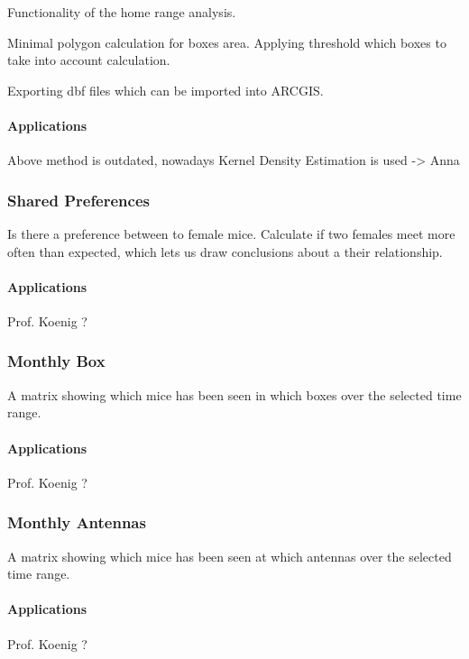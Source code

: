 Functionality of the home range analysis.

Minimal polygon calculation for boxes area.
Applying threshold which boxes to take into account calculation. 

Exporting dbf files which can be imported into ARCGIS.

\paragraph{Applications}
Above method is outdated, nowadays Kernel Density Estimation is used -> Anna

\subsubsection{Shared Preferences}
\label{subsubsec:sharedpref} 

Is there a preference between to female mice.
Calculate if two females meet more often than expected, which lets us draw conclusions about a their relationship.

\paragraph{Applications}
Prof. Koenig ?

\subsubsection{Monthly Box}
\label{subsubsec:monthbox}

A matrix  showing which mice has been seen in which boxes over the selected time range.

\paragraph{Applications}
Prof. Koenig ?

\subsubsection{Monthly Antennas}
\label{subsubsec:monthant}

A matrix  showing which mice has been seen at which antennas over the selected time range.

\paragraph{Applications}
Prof. Koenig ?
